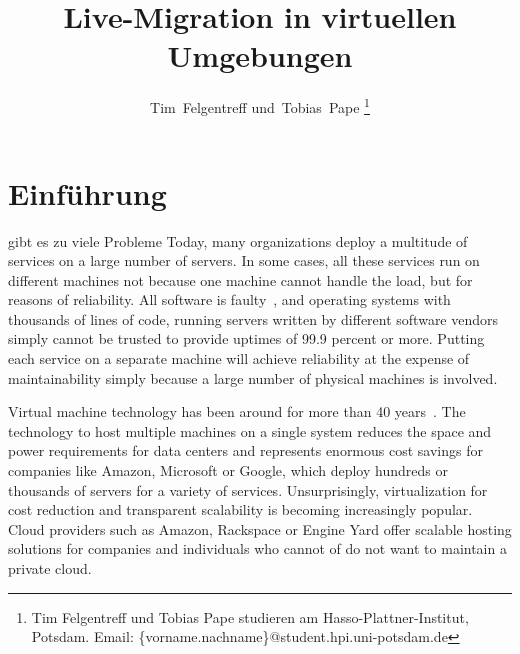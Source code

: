 \documentclass[draft,journal]{IEEEtran}
\makeatletter
\def\markboth#1#2{\def\leftmark{\@IEEEcompsoconly{\sffamily}\MakeUppercase{\protect#1}}%
\def\rightmark{\@IEEEcompsoconly{\sffamily}\MakeUppercase{\protect#2}}}
\makeatother
\begin{document}
\title{Live-Migration in virtuellen Umgebungen}
\author{Tim~Felgentreff und~Tobias~Pape%
\thanks{%
  Tim Felgentreff und Tobias Pape studieren am
  Hasso-Plattner-Institut, Potsdam.\goodbreak
  Email: \{vorname.nachname\}@student.hpi.uni-potsdam.de}%
}
\markboth{Industrieseminar Cloud-Computing}{Felgentreff, Pape: Live-Migration}

\maketitle
\tableofcontents

\begin{abstract}
  
\end{abstract}

\IEEEpeerreviewmaketitle


\section{Einführung}
\label{sec:einfuehrung}


 gibt es zu viele Probleme
Today, many organizations deploy a multitude of services on a large
number of servers. In some cases, all these services run on different
machines not because one machine cannot handle the load, but for
reasons of reliability.  All software is faulty~\cite{zellerprograms},
and operating systems with thousands of lines of code, running servers
written by different software vendors simply cannot be trusted to
provide uptimes of 99.9 percent or more. Putting each service on a
separate machine will achieve reliability at the expense of
maintainability simply because a large number of physical machines is
involved.

Virtual machine technology has been around for more than 40
years~\cite{tanenbaum1992modern}. The technology to host multiple
machines on a single system reduces the space and power requirements
for data centers and represents enormous cost savings for companies
like Amazon, Microsoft or Google, which deploy hundreds or thousands
of servers for a variety of services. Unsurprisingly, virtualization
for cost reduction and transparent scalability is becoming
increasingly popular. Cloud providers such as Amazon, Rackspace or
Engine Yard offer scalable hosting solutions for companies and
individuals who cannot of do not want to maintain a private cloud.
\end{document}

